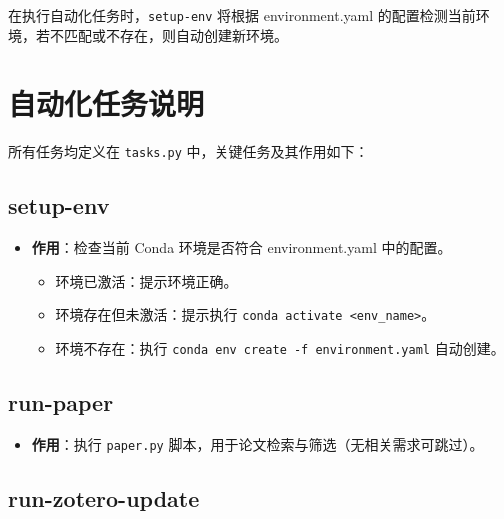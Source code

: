 \documentclass[
  letterpaper,
  DIV=11,
  numbers=noendperiod]{scrreprt}
\providecommand{\tightlist}{%
  \setlength{\itemsep}{0pt}\setlength{\parskip}{0pt}}\usepackage{longtable,booktabs,array}
\begin{document}
在执行自动化任务时，\texttt{setup-env} 将根据 environment.yaml
的配置检测当前环境，若不匹配或不存在，则自动创建新环境。

\section{自动化任务说明}\label{ux81eaux52a8ux5316ux4efbux52a1ux8bf4ux660e}

所有任务均定义在 \texttt{tasks.py} 中，关键任务及其作用如下：

\subsection{setup-env}\label{setup-env}

\begin{itemize}
\tightlist
\item
  \textbf{作用}：检查当前 Conda 环境是否符合 environment.yaml 中的配置。

  \begin{itemize}
  \tightlist
  \item
    环境已激活：提示环境正确。\\
  \item
    环境存在但未激活：提示执行
    \texttt{conda\ activate\ \textless{}env\_name\textgreater{}}。\\
  \item
    环境不存在：执行 \texttt{conda\ env\ create\ -f\ environment.yaml}
    自动创建。
  \end{itemize}
\end{itemize}

\subsection{run-paper}\label{run-paper}

\begin{itemize}
\tightlist
\item
  \textbf{作用}：执行 \texttt{paper.py}
  脚本，用于论文检索与筛选（无相关需求可跳过）。
\end{itemize}

\subsection{run-zotero-update}\label{run-zotero-update}
\end{document}
